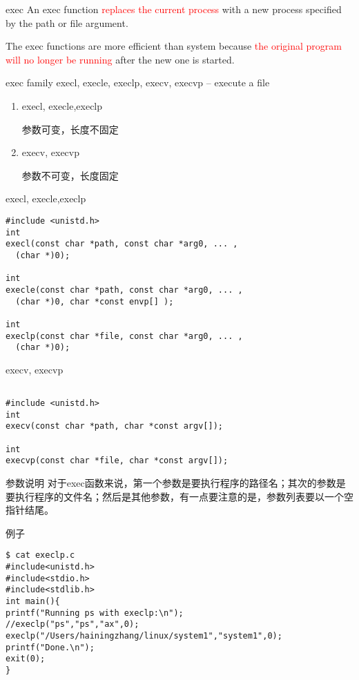 \documentclass{beamer}
\begin{document}
\begin{frame}{exec}
An exec function \textcolor{red}{replaces the current process} with a new process specified by the path or file argument.

The exec functions are more efficient than system because \textcolor{red}{the original program will no longer be running} after the new one is started.

\end{frame}
\begin{frame}{exec family}
execl, execle, execlp, execv, execvp -- execute a file
\begin{enumerate}
\item
execl, execle,execlp

参数可变，长度不固定
\item
 execv, execvp
 
 参数不可变，长度固定
\end{enumerate}
\end{frame}
\begin{frame}[fragile]{execl, execle,execlp}
\begin{block}{}
\begin{verbatim}
#include <unistd.h>
int
execl(const char *path, const char *arg0, ... , 
  (char *)0);

int
execle(const char *path, const char *arg0, ... , 
  (char *)0, char *const envp[] );

int
execlp(const char *file, const char *arg0, ... , 
  (char *)0);
\end{verbatim}
\end{block}
\end{frame}
\begin{frame}[fragile]{ execv, execvp}
\begin{block}{}
\begin{verbatim}

#include <unistd.h>
int
execv(const char *path, char *const argv[]);

int
execvp(const char *file, char *const argv[]);
\end{verbatim}
\end{block}
\end{frame}
\begin{frame}[fragile]{参数说明}
对于exec函数来说，第一个参数是要执行程序的路径名；其次的参数是要执行程序的文件名；然后是其他参数，有一点要注意的是，参数列表要以一个空指针结尾。
\begin{block}{例子}
\begin{verbatim}
$ cat execlp.c 
#include<unistd.h>
#include<stdio.h>
#include<stdlib.h>
int main(){
printf("Running ps with execlp:\n");
//execlp("ps","ps","ax",0);
execlp("/Users/hainingzhang/linux/system1","system1",0);
printf("Done.\n");
exit(0);
}

\end{verbatim}
\end{block}
\end{frame}
\end{document}
